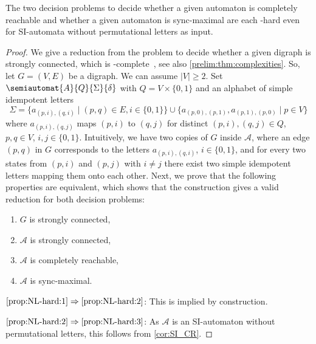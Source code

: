 \begin{theorem}\label{prop:NL-hard} \label{thm:sync_max_NL-hard}
	The two decision problems
	to decide whether a given automaton is completely reachable
	and whether a given automaton is sync-maximal
	are each \NL-hard even for SI-automata without permutational letters as input.
\end{theorem}
\begin{proof}
	We give a reduction from the problem
	to decide whether a given digraph
	is strongly connected, which is \NL-complete~\cite[Cor. 24]{Jones75}, see also \cref{prelim:thm:complexities}.
	So, let $G = (V, E)$ be a digraph. We can assume $|V| \ge 2$.
	Set $\semiautomat{A}{Q}{\Sigma}{\delta}$
	with $Q = V \times \{0,1\}$
	and an alphabet of simple idempotent letters
	\[
	\Sigma = \{ a_{(p, i), (q, i)} \mid (p,q) \in E, i \in \{0,1\}\} \cup 
	\{ a_{(p,0), (p,1)}, a_{(p,1), (p,0)} \mid p \in V \}
	\]
	where $a_{(p, i), (q, j)}$ maps $(p, i)$ to $(q, j)$
	for distinct $(p,i), (q, j) \in Q$, $p,q \in V$, $i,j \in \{0,1\}$.
	Intuitively, we have two copies of $G$
	inside $\mathcal A$, where an edge $(p,q)$ in $G$ corresponds to the letters $ a_{(p, i), (q, i)}$, $i \in \{0,1\}$, and 
	for every two states from $(p,i)$ and $(p,j)$ with $i \ne j$    
	there exist two simple idempotent letters mapping 
	them onto each other.	
	Next, we prove that the following properties are equivalent, which shows that the construction gives a valid reduction for both decision problems: 
	\begin{enumerate} 
		\item \label{prop:NL-hard:1} $G$ is strongly connected, 
		
		\item \label{prop:NL-hard:2} $\mathcal A$ is strongly connected,
		
		\item \label{prop:NL-hard:3} $\mathcal A$ is completely reachable,
		
		
		\item \label{prop:NL-hard:4} $\mathcal A$ is sync-maximal. 
	\end{enumerate}
	
	$\ref{prop:NL-hard:1} \Rightarrow \ref{prop:NL-hard:2}$: This is implied by construction.
	
	$\ref{prop:NL-hard:2} \Rightarrow \ref{prop:NL-hard:3}$: As $\mathcal A$ is an SI-automaton without permutational letters,
	this follows from \cref{cor:SI_CR}. 
	

\end{proof}
